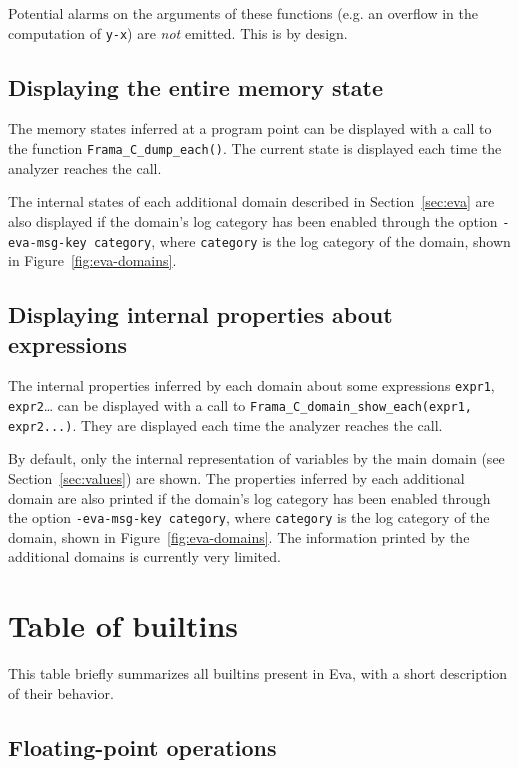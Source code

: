 \documentclass[web]{frama-c-book}
\newcommand{\Eva}{\textsf{Eva}}
\begin{document}
Potential alarms on the arguments of these functions (e.g. an overflow
in the computation of \lstinline|y-x|) are \emph{not} emitted. This is
by design.

\subsection{Displaying the entire memory state}

The memory states inferred at a program point can be displayed with a call to
the function \lstinline|Frama_C_dump_each()|. The current state is displayed
each time the analyzer reaches the call.

The internal states of each additional domain described in Section~\ref{sec:eva}
are also displayed if the domain's log category has been enabled through the
option \verb+-eva-msg-key category+, where \verb+category+ is the log category
of the domain, shown in Figure~\ref{fig:eva-domains}.

\subsection{Displaying internal properties about expressions}

The internal properties inferred by each domain about some expressions
\lstinline|expr1|, \lstinline|expr2|… can be displayed with a call to
\lstinline|Frama_C_domain_show_each(expr1, expr2...)|. They are displayed each
time the analyzer reaches the call.

By default, only the internal representation of variables by the main domain
(see Section~\ref{sec:values}) are shown. The properties inferred by each
additional domain are also printed if the domain's log category has been enabled
through the option \verb+-eva-msg-key category+, where \verb+category+ is the
log category of the domain, shown in Figure~\ref{fig:eva-domains}. The
information printed by the additional domains is currently very limited.


\section{Table of builtins}
\label{builtins-list}

This table briefly summarizes all builtins present in \Eva{}, with
a short description of their behavior.

\subsection{Floating-point operations}
\end{document}
